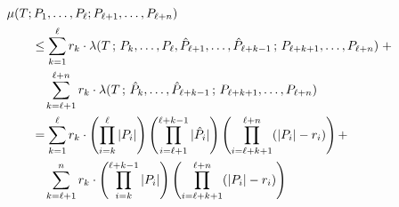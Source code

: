     \begin{align*}
        &\mu(T; P_1, \ldots, P_\ell; P_{\ell+1}, \ldots, P_{\ell+n}) \nonumber\\
        &\qquad\leq    
            \sum_{k=1}^\ell r_k\cdot \lambda(T\,;\,P_{k}, \ldots, P_{\ell}, \hat{P}_{\ell+1}, \ldots, \hat{P}_{\ell+k-1} \,;\, P_{\ell+{k+1}}, \ldots, P_{\ell + n} )
                \;+
                \nonumber\\
                &\qquad\quad 
            \sum_{k=\ell + 1}^{\ell + n} r_k\cdot  \lambda(T\,;\,\hat{P}_{k}, \ldots, \hat{P}_{\ell+k-1}\,;\, P_{\ell+{k+1}}, \ldots, P_{\ell + n})
        \\
        &\qquad =
            \sum_{k=1}^\ell r_k\cdot
                \left(  \prod_{i=k}^{\ell}     
                                                        |P_{i}|      \right)   
                \left(  \prod_{i=\ell + 1}^{\ell+k-1}     
                                                        |\hat{P}_{i}|      \right)   
                \left(  \prod_{i=\ell+k+1}^{\ell+n}     
                                                        (|P_i| - r_i)
                                                                            \right)
                + 
                \nonumber \\
        &\qquad\quad    
        \sum_{k=\ell+1}^n r_k\cdot
                \left(  \prod_{i=k}^{\ell+ k - 1}        
                                                        |P_i|         \right)
                \left(  \prod_{i=\ell+k+1}^{\ell + n}   
                                                        (|P_i| - r_i)
                                                                            \right)
    \end{align*}
